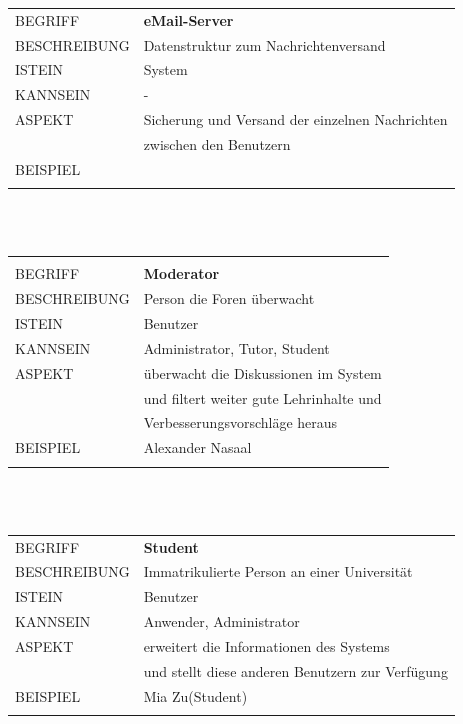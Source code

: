 \documentclass[12pt,a4paper]{article}
\begin{document}
\begin{tabular}{l p{12cm}}
	BEGRIFF 	 & \textbf{eMail-Server} \\ 
	BESCHREIBUNG & Datenstruktur zum Nachrichtenversand \\
	ISTEIN   	 & System \\
	KANNSEIN 	 & - \\ 
	ASPEKT   	 & Sicherung und Versand der einzelnen Nachrichten\\
	& zwischen den Benutzern \\
	BEISPIEL 	 & \\\\
	\hline
\end{tabular}\\\\   

\begin{tabular}{l p{12cm}}
	\hline\\
	BEGRIFF 	 & \textbf{Moderator} \\ 
	BESCHREIBUNG & Person die Foren überwacht\\
	ISTEIN   	 & Benutzer \\
	KANNSEIN 	 & Administrator, Tutor, Student \\ 
	ASPEKT   	 & überwacht die Diskussionen im System \\
	& und filtert weiter gute Lehrinhalte und\\
	& Verbesserungsvorschläge heraus\\
	BEISPIEL 	 & Alexander Nasaal\\\\
	\hline
\end{tabular}\\\\   

\begin{tabular}{l p{12cm}}
	BEGRIFF 	 & \textbf{Student} \\ 
	BESCHREIBUNG & Immatrikulierte Person an einer Universität \\ 
	ISTEIN   	 & Benutzer \\
	KANNSEIN 	 & Anwender, Administrator \\ 
	ASPEKT   	 & erweitert die Informationen des Systems\\
	& und stellt diese anderen Benutzern zur Verfügung \\
	BEISPIEL 	 & Mia Zu(Student)\\\\
	\hline
\end{tabular}\\\\  
\end{document}
